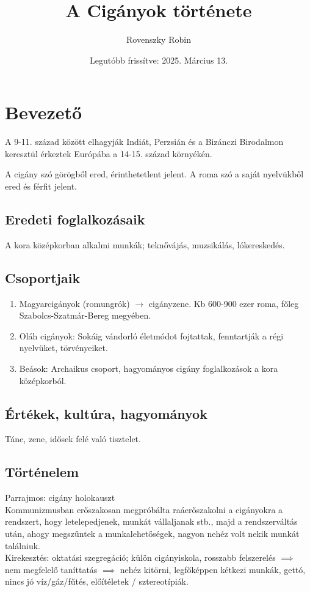 \documentclass{article}
\title{A Cigányok története}
\author{Rovenszky Robin}
\date{Legutóbb frissítve: 2025. Március 13.}
\begin{document}
\maketitle

\section{Bevezető}
A 9-11. század között elhagyják Indiát, Perzsián és a Bizánczi Birodalmon keresztül érkeztek Európába a 14-15. század környékén.

A cigány szó görögből ered, érinthetetlent jelent. A roma szó a saját nyelvükből ered és férfit jelent.

\subsection{Eredeti foglalkozásaik}
A kora középkorban alkalmi munkák; teknővájás, muzsikálás, lókereskedés.

\subsection{Csoportjaik}

\begin{enumerate}
    \item Magyarcigányok (romungrók) $\rightarrow$ cigányzene. Kb 600-900 ezer roma, főleg Szabolcs-Szatmár-Bereg megyében.
    \item Oláh cigányok: Sokáig vándorló életmódot fojtattak, fenntartják a régi nyelvüket, törvényeiket.
    \item Beások: Archaikus csoport, hagyományos cigány foglalkozások a kora középkorból. 
\end{enumerate}

\subsection{Értékek, kultúra, hagyományok}
Tánc, zene, idősek felé való tisztelet.

\subsection{Történelem}
Parrajmos: cigány holokauszt\\
Kommunizmusban erőszakosan megpróbálta raáerőszakolni a cigányokra a rendszert, hogy letelepedjenek, munkát vállaljanak stb., majd a rendszerváltás után, ahogy megszűntek a munkalehetőségek, nagyon nehéz volt nekik munkát találniuk.\\

Kirekesztés: oktatási szegregáció; külön cigányiskola, rosszabb felszerelés $\implies$ nem megfelelő taníttatás $\implies$ nehéz kitörni, legfőképpen kétkezi munkák, gettó, nincs jó víz/gáz/fűtés, előítéletek / sztereotípiák.
\end{document}
